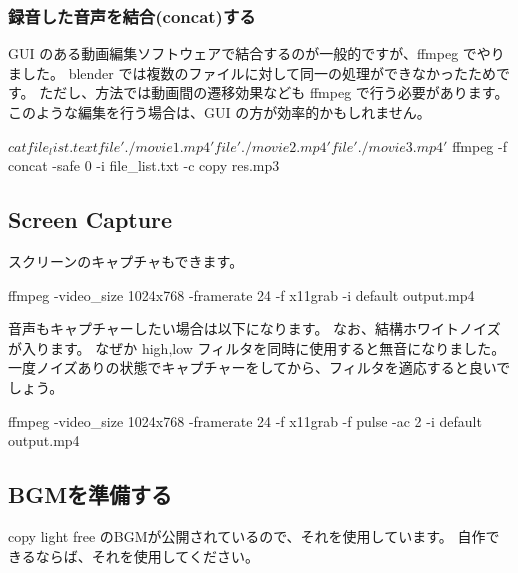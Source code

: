 \documentclass[mingoth,a4paper]{jsarticle}
\begin{document}
\subsubsection{録音した音声を結合(concat)する}

GUI のある動画編集ソフトウェアで結合するのが一般的ですが、ffmpeg でやりました。
blender では複数のファイルに対して同一の処理ができなかったためです。
ただし、方法では動画間の遷移効果なども ffmpeg で行う必要があります。
このような編集を行う場合は、GUI の方が効率的かもしれません。

\begin{commandline}
$ cat file_list.text
file './movie1.mp4'
file './movie2.mp4'
file './movie3.mp4'
$ ffmpeg -f concat -safe 0 -i file_list.txt -c copy res.mp3
\end{commandline}

%
%
%
%

\subsection{Screen Capture}

スクリーンのキャプチャもできます。

\begin{commandline}
ffmpeg -video_size 1024x768 -framerate 24 -f x11grab -i default  output.mp4
\end{commandline}

音声もキャプチャーしたい場合は以下になります。
なお、結構ホワイトノイズが入ります。
なぜか high,low フィルタを同時に使用すると無音になりました。
一度ノイズありの状態でキャプチャーをしてから、フィルタを適応すると良いでしょう。

\begin{commandline}
ffmpeg -video_size 1024x768 -framerate 24 -f x11grab -f pulse -ac 2 -i default output.mp4
\end{commandline}

\subsection{BGMを準備する}

copy light free のBGMが公開されているので、それを使用しています。
自作できるならば、それを使用してください。	
\end{document}
